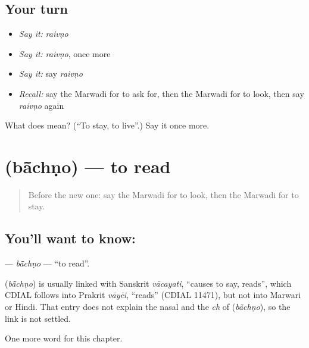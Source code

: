 \subsection*{Your turn}
\begin{itemize}
\raggedright
  \item \emph{Say it:} \emph{raivṇo}
  \item \emph{Say it:} \emph{raivṇo}, once more
  \item \emph{Say it:} say \emph{raivṇo}
  \item \emph{Recall:} say the Marwadi for to ask for, then the Marwadi for to look, then say \emph{raivṇo} again
\end{itemize}

\begin{tcolorbox}[breakable,colback=teal!4,colframe=teal!35!black,title={Before you move on}]
What does  mean? (\textquotedblleft{}To stay, to live\textquotedblright{}.) Say it once more.
\end{tcolorbox}
\section[\texorpdfstring{\mw{बांचणो} (bā̃chṇo)}{बांचणो (bā̃chṇo)}]{ (bā̃chṇo) — to read}

\label{lesson:MW-C105-bachno}



\begin{quote}
Before the new one: say the Marwadi for to look, then the Marwadi for to stay.
\end{quote}

\subsection*{You'll want to know: }
\textbf{} — \emph{bā̃chṇo} — \textquotedblleft{}to read\textquotedblright{}.

\begin{cousinweb}
\textbf{} (\emph{bā̃chṇo}) is usually linked with Sanskrit \emph{vācayati}, \textquotedblleft{}causes to say, reads\textquotedblright{}, which CDIAL follows into Prakrit \emph{vāyēi}, \textquotedblleft{}reads\textquotedblright{} (CDIAL 11471), but not into Marwari or Hindi. That entry does not explain the nasal and the \emph{ch} of \textbf{} (\emph{bā̃chṇo}), so the link is not settled.
\end{cousinweb}

\begin{grammarlens}[title={What you've built}]
One more word for this chapter.
\end{grammarlens}

